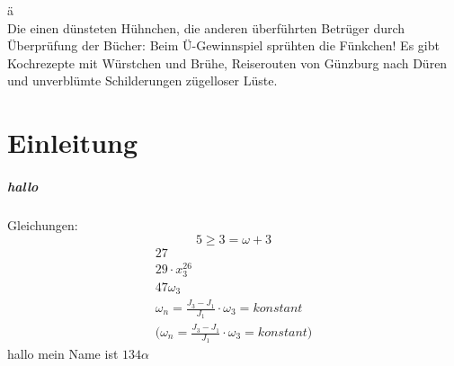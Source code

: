 \documentclass[paper=a4,bibliography=totoc,BCOR=10mm,twoside,numbers=noenddot,fontsize=11pt]{article}
\begin{document}
\"a \\
Die einen dünsteten Hühnchen, die anderen überführten Betrüger durch Überprüfung der Bücher: Beim Ü-Gewinnspiel sprühten die Fünkchen! Es gibt Kochrezepte mit Würstchen und Brühe, Reiserouten von Günzburg nach Düren und unverblümte Schilderungen zügelloser Lüste.


\section{Einleitung}
\subparagraph{hallo}



Gleichungen:
\begin{equation}
5\geq3=\omega+3
\end{equation}
\begin{align}
27\\
29 \cdot x^{26}_3\\
47 \omega_3\\
\omega_n = \frac{J_3 - J_1}{J_1} \cdot \omega_3 = konstant\\
\Biggl( \omega_n = \frac{J_3 - J_1}{J_1} \cdot \omega_3 = konstant \Biggr)
\end{align}
hallo mein Name ist $134\alpha$
\end{document}
